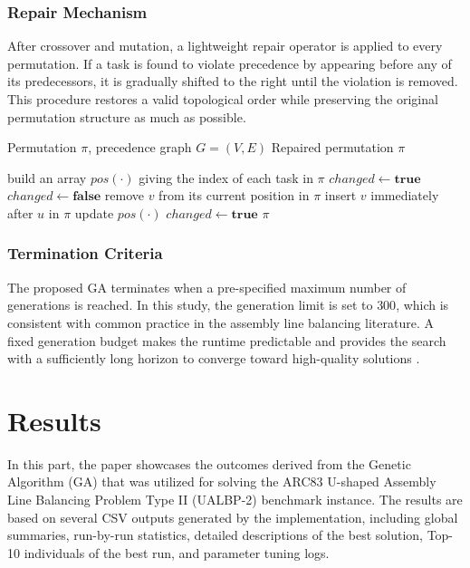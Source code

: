 \documentclass[12pt,a4paper]{article}
\begin{document}
\subsubsection{Repair Mechanism}

After crossover and mutation, a lightweight repair operator is applied to every permutation. If a task is found to violate precedence by appearing before any of its predecessors, it is gradually shifted to the right until the violation is removed. This procedure restores a valid topological order while preserving the original permutation structure as much as possible.
\begin{algorithm}[H]
\caption{RepairToTopological (Lightweight Repair)}
\label{alg:repair}
\begin{algorithmic}[1]
\Require Permutation $\pi$, precedence graph $G=(V,E)$
\Ensure Repaired permutation $\pi$

\State build an array $pos(\cdot)$ giving the index of each task in $\pi$
\State $changed \gets \textbf{true}$
    \State $changed \gets \textbf{false}$
         
            \State remove $v$ from its current position in $\pi$
            \State insert $v$ immediately after $u$ in $\pi$ 
            \State update $pos(\cdot)$
            \State $changed \gets \textbf{true}$
        \EndIf
    \EndFor
\EndWhile
\State \Return $\pi$
\end{algorithmic}
\end{algorithm}


\subsubsection{Termination Criteria}
The proposed GA terminates when a pre-specified maximum number of generations is reached. In this study, the generation limit is set to $300$, which is consistent with common practice in the assembly line balancing literature. A fixed generation budget makes the runtime predictable and provides the search with a sufficiently long horizon to converge toward high-quality solutions \cite{PapadimitriouSteiglitz1998}.


\newpage
\section{Results}

In this part, the paper showcases the outcomes derived from the Genetic Algorithm (GA) that was utilized for solving the ARC83 U-shaped Assembly Line Balancing Problem Type II (UALBP-2) benchmark instance. The results are based on several CSV outputs generated by the implementation, including global summaries, run-by-run statistics, detailed descriptions of the best solution, Top-10 individuals of the best run, and parameter tuning logs.
\end{document}
